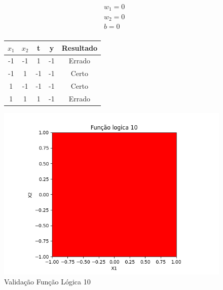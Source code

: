 \begin{figure}[h!]
\centering
\begin{minipage}[c]{0.49\linewidth}
\centering
\[
\begin{aligned}
&w_1 = 0\\
&w_2 = 0\\
&b = 0\\
\end{aligned}
\]
\begin{tabular}{|c|c|c|c|c|}\hline
$x_1$ & $x_2$ & t & y & Resultado\\ \hline
 -1 & -1 & 1 & -1 & Errado\\ \hline
 -1 & 1 & -1 & -1 & Certo\\ \hline
 1 & -1 & -1 & -1 & Certo\\ \hline
 1 & 1 & 1 & -1 & Errado\\ \hline
\end{tabular}
\end{minipage}
\hfill
\begin{minipage}[c]{0.5\linewidth}
\centering
\singlespacing
\includegraphics[width=1.2\textwidth]{im/im10}
\end{minipage}
\caption{Validação Função Lógica 10}
\label{vl10}
\end{figure}

